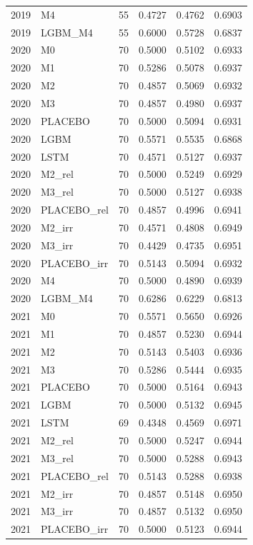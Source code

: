 \begin{tabular}{llrrrr}
2019 & M4 & 55 & 0.4727 & 0.4762 & 0.6903 \\
2019 & LGBM\_M4 & 55 & 0.6000 & 0.5728 & 0.6837 \\
2020 & M0 & 70 & 0.5000 & 0.5102 & 0.6933 \\
2020 & M1 & 70 & 0.5286 & 0.5078 & 0.6937 \\
2020 & M2 & 70 & 0.4857 & 0.5069 & 0.6932 \\
2020 & M3 & 70 & 0.4857 & 0.4980 & 0.6937 \\
2020 & PLACEBO & 70 & 0.5000 & 0.5094 & 0.6931 \\
2020 & LGBM & 70 & 0.5571 & 0.5535 & 0.6868 \\
2020 & LSTM & 70 & 0.4571 & 0.5127 & 0.6937 \\
2020 & M2\_rel & 70 & 0.5000 & 0.5249 & 0.6929 \\
2020 & M3\_rel & 70 & 0.5000 & 0.5127 & 0.6938 \\
2020 & PLACEBO\_rel & 70 & 0.4857 & 0.4996 & 0.6941 \\
2020 & M2\_irr & 70 & 0.4571 & 0.4808 & 0.6949 \\
2020 & M3\_irr & 70 & 0.4429 & 0.4735 & 0.6951 \\
2020 & PLACEBO\_irr & 70 & 0.5143 & 0.5094 & 0.6932 \\
2020 & M4 & 70 & 0.5000 & 0.4890 & 0.6939 \\
2020 & LGBM\_M4 & 70 & 0.6286 & 0.6229 & 0.6813 \\
2021 & M0 & 70 & 0.5571 & 0.5650 & 0.6926 \\
2021 & M1 & 70 & 0.4857 & 0.5230 & 0.6944 \\
2021 & M2 & 70 & 0.5143 & 0.5403 & 0.6936 \\
2021 & M3 & 70 & 0.5286 & 0.5444 & 0.6935 \\
2021 & PLACEBO & 70 & 0.5000 & 0.5164 & 0.6943 \\
2021 & LGBM & 70 & 0.5000 & 0.5132 & 0.6945 \\
2021 & LSTM & 69 & 0.4348 & 0.4569 & 0.6971 \\
2021 & M2\_rel & 70 & 0.5000 & 0.5247 & 0.6944 \\
2021 & M3\_rel & 70 & 0.5000 & 0.5288 & 0.6943 \\
2021 & PLACEBO\_rel & 70 & 0.5143 & 0.5288 & 0.6938 \\
2021 & M2\_irr & 70 & 0.4857 & 0.5148 & 0.6950 \\
2021 & M3\_irr & 70 & 0.4857 & 0.5132 & 0.6950 \\
2021 & PLACEBO\_irr & 70 & 0.5000 & 0.5123 & 0.6944 \\

\end{tabular}
